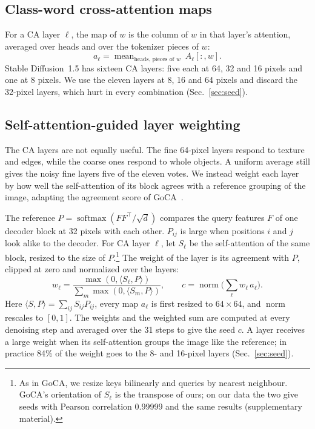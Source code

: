 \subsection{Class-word cross-attention maps}
\label{sec:method_ca}
For a CA layer $\ell$, the map of $w$ is the column of $w$ in that layer's attention, averaged over heads and over the tokenizer pieces of $w$:
\begin{equation}
a_\ell=\operatorname{mean}_{\text{heads, pieces of }w}\ A_\ell[:,w].
\label{eq:ca}
\end{equation}
Stable Diffusion~1.5 has sixteen CA layers: five each at 64, 32 and 16 pixels and one at 8 pixels. We use the eleven layers at 8, 16 and 64 pixels and discard the 32-pixel layers, which hurt in every combination (Sec.~\ref{sec:seed}).

\subsection{Self-attention-guided layer weighting}
\label{sec:method_weight}
The CA layers are not equally useful. The fine 64-pixel layers respond to texture and edges, while the coarse ones respond to whole objects. A uniform average still gives the noisy fine layers five of the eleven votes. We instead weight each layer by how well the self-attention of its block agrees with a reference grouping of the image, adapting the agreement score of GoCA~\cite{meng2026making}.

The reference $P=\operatorname{softmax}(FF^\top/\sqrt d)$ compares the query features $F$ of one decoder block at 32 pixels with each other. $P_{ij}$ is large when positions $i$ and $j$ look alike to the decoder. For CA layer $\ell$, let $S_\ell$ be the self-attention of the same block, resized to the size of $P$.\footnote{As in GoCA, we resize keys bilinearly and queries by nearest neighbour. GoCA's orientation of $S_\ell$ is the transpose of ours; on our data the two give seeds with Pearson correlation 0.99999 and the same results (supplementary material).} The weight of the layer is its agreement with $P$, clipped at zero and normalized over the layers:
\begin{equation}
w_\ell=\frac{\max(0,\langle S_\ell,P\rangle)}{\sum_{m}\max(0,\langle S_m,P\rangle)},\qquad
c=\operatorname{norm}\Big(\sum_\ell w_\ell\,a_\ell\Big).
\label{eq:weights}
\end{equation}
Here $\langle S,P\rangle=\sum_{ij}S_{ij}P_{ij}$, every map $a_\ell$ is first resized to $64\times64$, and $\operatorname{norm}$ rescales to $[0,1]$. The weights and the weighted sum are computed at every denoising step and averaged over the 31 steps to give the seed $c$. A layer receives a large weight when its self-attention groups the image like the reference; in practice 84\% of the weight goes to the 8- and 16-pixel layers (Sec.~\ref{sec:seed}).

